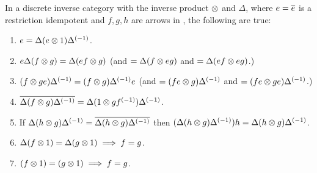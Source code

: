 \begin{lemma}\label{lem:properties_of_delta_and_tensor_in_a_discrete_inverse_category}
  In a discrete inverse category \X with the inverse product $\otimes$ and $\Delta$, where
  $e=\overline{e}$ is a restriction idempotent and $f,g,h$ are arrows in \X, the following are true:
  \begin{enumerate}[{(}i{)}]
    \item{}$e=\Delta (e\otimes 1) {\Delta}^{(-1)}$.\label{le:eisde1}
    \item{}$e\Delta (f \otimes g) = \Delta (e f \otimes g) $ (and $= \Delta (f \otimes e g) $ and
      $ = \Delta (e f \otimes e g)$.)\label{le:deltaefg}
    \item{}$ (f \otimes g e) {\Delta}^{(-1)} =(f \otimes g) {\Delta}^{(-1)} e $ (and $= (f e\otimes g) {\Delta}^{(-1)}$ and
      $ = (f e\otimes g e){\Delta}^{(-1)}$.)\label{le:efginvdelta}
    \item{}$\overline{\Delta (f \otimes g) {\Delta}^{(-1)}} =
       \Delta(1\otimes g {f}^{(-1)}){\Delta}^{(-1)}$. \label{le:restfg}
    \item{} If $\Delta (h \otimes g) {\Delta}^{(-1)} = \overline{\Delta (h \otimes g) {\Delta}^{(-1)}}$ then
      $(\Delta (h \otimes g) {\Delta}^{(-1)}) h = \Delta (h \otimes g) {\Delta}^{(-1)}$.\label{le:hge}
    \item{}$\Delta (f\otimes1) = \Delta (g\otimes1) \implies f = g$.\label{le:dfgisfg}
    \item{}$(f\otimes1) = (g\otimes1) \implies f = g$.\label{le:fgisfg}
  \end{enumerate}
\end{lemma}
